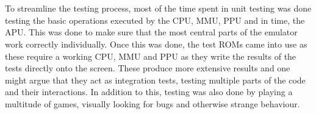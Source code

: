 \\\\
To streamline the testing process, most of the time spent in unit testing was done testing the basic operations executed by the CPU, MMU, PPU and in time, the APU. This was done to make sure that the most central parts of the emulator work correctly individually. Once this was done, the test ROMs came into use as these require a working CPU, MMU and PPU as they write the results of the tests directly onto the screen. These produce more extensive results and one might argue that they act as integration tests, testing multiple parts of the code and their interactions. In addition to this, testing was also done by playing a multitude of games, visually looking for bugs and otherwise strange behaviour.
